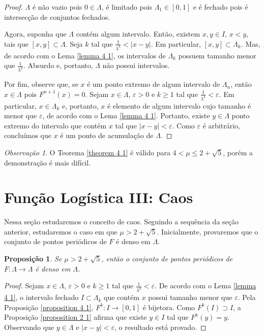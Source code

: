 \documentclass[a4paper, 12pt]{article}
\theoremstyle{definition}
\theoremstyle{plain}
\newtheorem{proposition}[definition]{Proposição}
\theoremstyle{plain}
\theoremstyle{plain}
\theoremstyle{definition}
\theoremstyle{remark}
\newtheorem*{remark}{Observação}
\begin{document}
\begin{proof}
$\Lambda$ é não vazio pois $0 \in \Lambda$, é limitado pois $\Lambda_1 \in [0, 1]$ e é fechado pois é intersecção de conjuntos fechados.

Agora, suponha que $\Lambda$ contém algum intervalo. Então, existem $x, y \in I$, $x < y$, tais que $[x, y] \subset \Lambda$. Seja $k$ tal que $\frac{1}{\lambda^k} < |x - y|$. Em particular, $[x, y] \subset \Lambda_k$. Mas, de acordo com o Lema \ref{lemma 4 1}, os intervalos de $\Lambda_k$ possuem tamanho menor que $\frac{1}{\lambda^k}$. Absurdo e, portanto, $\Lambda$ não possui intervalos.

Por fim, observe que, se $x$ é um ponto extremo de algum intervalo de $\Lambda_n$, então $x \in \Lambda$ pois $F^{n+1}(x) = 0$. Sejam $x \in \Lambda$, $\varepsilon > 0$ e $k \geq 1$ tal que $\frac{1}{\lambda^k} < \varepsilon$. Em particular, $x \in \Lambda_k$ e, portanto, $x$ é elemento de algum intervalo cujo tamanho é menor que $\varepsilon$, de acordo com o Lema \ref{lemma 4 1}. Portanto, existe $y \in \Lambda$ ponto extremo do intervalo que contém $x$ tal que $|x - y| < \varepsilon$. Como $\varepsilon$ é arbitrário, concluímos que $x$ é um ponto de acumulação de $\Lambda$.
\end{proof}

\begin{remark}
O Teorema \ref{theorem 4 1} é válido para $4 < \mu \leq 2 + \sqrt{5}$, porém a demonstração é mais difícil.
\end{remark}

\section{Função Logística III: Caos}

Nessa seção estudaremos o conceito de caos. Seguindo a sequência da seção anterior, estudaremos o caso em que $\mu > 2 + \sqrt{5}$. Inicialmente, provaremos que o conjunto de pontos periódicos de $F$ é denso em $\Lambda$.

\begin{proposition}
\label{proposition 4 2}
Se $\mu > 2 + \sqrt{5}$, então o conjunto de pontos periódicos de $F: \Lambda \to \Lambda$ é denso em $\Lambda$.
\end{proposition}

\begin{proof}
Sejam $x \in \Lambda$, $\varepsilon > 0$ e $k \geq 1$ tal que $\frac{1}{\lambda^k} < \varepsilon$. De acordo com o Lema \ref{lemma 4 1}, o intervalo fechado $I \subset \Lambda_k$ que contém $x$ possui tamanho menor que $\varepsilon$. Pela Proposição \ref{proposition 4 1}, $F^k: I \to [0, 1]$ é bijetora. Como $F^k(I) \supset I$, a Proposição \ref{proposition 2 1} afirma que existe $y \in I$ tal que $F^k(y) = y$. Observando que $y \in \Lambda$ e $|x - y| < \varepsilon$, o resultado está provado.
\end{proof}
\end{document}
